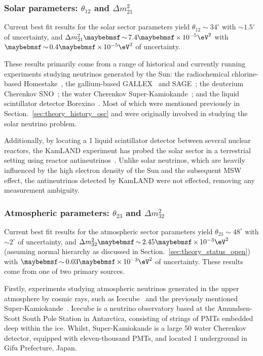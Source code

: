 \subsubsection*{Solar parameters: $\theta_{12}$ and $\Delta m^{2}_{21}$} %

Current best fit results for the solar sector parameters yield $\theta_{12}\sim34^{\circ}$ with
$\sim1.5^{\circ}$ of uncertainty, and $\Delta m^{2}_{21}\sim7.4\times10^{-5}\eV^{2}$ with
$\sim0.4\times10^{-5}\eV^{2}$ of uncertainty.

These results primarily come from a range of historical and currently running experiments studying
neutrinos generated by the Sun: the radiochemical chlorine-based Homestake~\cite{cleveland1998},
the gallium-based GALLEX~\cite{kaether2010} and SAGE~\cite{abdurashitov2009}; the deuterium
Cherenkov SNO~\cite{maneira2011}; the water Cherenkov Super-Kamiokande~\cite{hosaka2006,
    cravens2008, abe2011_super, nakano2017}; and the liquid scintillator detector
Borexino~\cite{bellini2011, bellini2010, bellini2014}. Most of which were mentioned previously in
Section.~\ref{sec:theory_history_osc} and were originally involved in studying the solar neutrino
problem.

Additionally, by locating a \unit{1}{} liquid scintillator detector between several
nuclear reactors, the KamLAND experiment has probed the solar sector in a terrestrial setting
using reactor antineutrinos~\cite{gando2011}. Unlike solar neutrinos, which are heavily influenced
by the high electron density of the Sun and the subsequent MSW effect, the antineutrinos detected
by KamLAND were not effected, removing any measurement ambiguity.

\subsubsection*{Atmospheric parameters: $\theta_{23}$ and $\Delta m^{2}_{32}$} %

Current best fit results for the atmospheric sector parameters yield $\theta_{23}\sim48^{\circ}$
with $\sim2^{\circ}$ of uncertainty, and $\Delta m^{2}_{32}\sim2.45\times10^{-3}\eV^{2}$ (assuming
normal hierarchy as discussed in Section.~\ref{sec:theory_status_open}) with
$\sim0.03\times10^{-3}\eV^{2}$ of uncertainty. These results come from one of two primary sources.

Firstly, experiments studying atmospheric neutrinos generated in the upper atmosphere by cosmic
rays, such as Icecube~\cite{karle2003, aartsen2015} and the previously mentioned
Super-Kamiokande~\cite{abe2018}. Icecube is a neutrino observatory based at the Amundsen-Scott
South Pole Station in Antarctica, consisting of strings of PMTs embedded deep within the ice.
Whilst, Super-Kamiokande is a large \unit{50}{} water Cherenkov detector, equipped with
eleven-thousand PMTs, and located \unit{1}{} underground in Gifu Prefecture, Japan.

